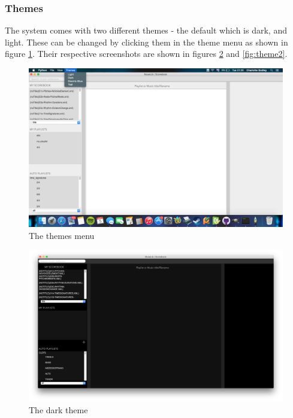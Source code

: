 \subsubsection{Themes}
The system comes with two different themes - the default which is dark, and light. These can be changed by clicking them in the theme menu as shown in figure \ref{fig:themes}. Their respective screenshots are shown in figures \ref{fig:theme1} and \ref{fig:theme2}.
\begin{figure}[H]
\centering
\includegraphics[width=500pt]{theme}
\caption{The themes menu}
\label{fig:themes}	
\end{figure}

\begin{figure}[H]
\centering
\includegraphics[width=400pt]{main_screenshot}
\caption{The dark theme}
\label{fig:theme1}	
\end{figure}

